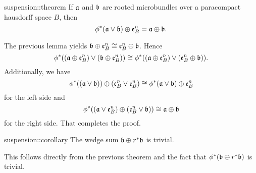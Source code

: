 \begin{mytheorem}{suspension::theorem}
    If $\mathfrak{a}$ and $\mathfrak{b}$ are rooted microbundles
    over a paracompact hausdorff space $B$, then
    \[ \phi^*(\mathfrak{a} \vee \mathfrak{b}) \oplus{} \mathfrak{e}^{n}_{B} = \mathfrak{a} \oplus{} \mathfrak{b}. \]
\end{mytheorem}

\begin{myproof}
    The previous lemma yields $\mathfrak{b} \oplus{} \mathfrak{e}^{n}_{B} \cong \mathfrak{e}^{n}_{B} \oplus{} \mathfrak{b}$.
    Hence
    \[
        \phi^*((\mathfrak{a} \oplus{} \mathfrak{e}^{n}_{B}) \vee (\mathfrak{b} \oplus{} \mathfrak{e}^{n}_{B}))
        \cong \phi^*((\mathfrak{a} \oplus{} \mathfrak{e}^{n}_{B}) \vee (\mathfrak{e}^{n}_{B} \oplus{} \mathfrak{b})).
    \]
    Additionally, we have
    \[
        \phi^*((\mathfrak{a} \vee \mathfrak{b})) \oplus{} (\mathfrak{e}^{n}_{B} \vee \mathfrak{e}^{n}_{B})
        \cong \phi^*(\mathfrak{a} \vee \mathfrak{b}) \oplus{} \mathfrak{e}^{n}_{B}
    \]
    for the left side and
    \[
        \phi^*((\mathfrak{a} \vee \mathfrak{e}^{n}_{B}) \oplus{} (\mathfrak{e}^{n}_{B} \vee \mathfrak{b}))
        \cong \mathfrak{a} \oplus{} \mathfrak{b}
    \]
    for the right side. That completes the proof.
\end{myproof}

\begin{mycorollary}{suspension::corollary}
    The wedge sum $\mathfrak{b} \oplus{} r^*\mathfrak{b}$ is trivial.
\end{mycorollary}

\begin{myproof}
    This follows directly from the previous theorem and
    the fact that $\phi^*(\mathfrak{b} \oplus{} r^*\mathfrak{b})$ is trivial.
\end{myproof}